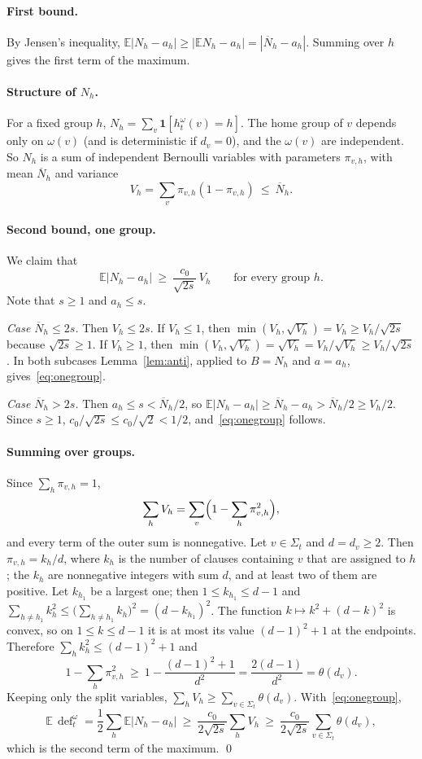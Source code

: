 \documentclass[11pt,a4paper]{article}
\theoremstyle{definition}
\theoremstyle{remark}
\newcommand{\E}{\mathbb{E}}
\newcommand{\dfc}{\operatorname{def}}
\newcommand{\Nbar}{\overline{N}}
\begin{document}
\paragraph{First bound.} By Jensen's inequality,
$\E|N_h-a_h|\ge|\E N_h-a_h|=|\Nbar_h-a_h|$. Summing over $h$ gives the first term of the
maximum.

\paragraph{Structure of $N_h$.} For a fixed group $h$,
$N_h=\sum_v\mathbf 1[h^\omega_t(v)=h]$. The home group of $v$ depends only on $\omega(v)$
(and is deterministic if $d_v=0$), and the $\omega(v)$ are independent. So $N_h$ is a sum of
independent Bernoulli variables with parameters $\pi_{v,h}$, with mean $\Nbar_h$ and variance
\[
V_h=\sum_v\pi_{v,h}(1-\pi_{v,h})\ \le\ \Nbar_h .
\]

\paragraph{Second bound, one group.} We claim that
\begin{equation}\label{eq:onegroup}
\E|N_h-a_h|\ \ge\ \frac{c_0}{\sqrt{2s}}\,V_h\qquad\text{for every group }h.
\end{equation}
Note that $s\ge1$ and $a_h\le s$.

\emph{Case $\Nbar_h\le2s$.} Then $V_h\le2s$. If $V_h\le1$, then
$\min(V_h,\sqrt{V_h})=V_h\ge V_h/\sqrt{2s}$ because $\sqrt{2s}\ge1$. If $V_h\ge1$, then
$\min(V_h,\sqrt{V_h})=\sqrt{V_h}=V_h/\sqrt{V_h}\ge V_h/\sqrt{2s}$. In both subcases
Lemma~\ref{lem:anti}, applied to $B=N_h$ and $a=a_h$, gives~\eqref{eq:onegroup}.

\emph{Case $\Nbar_h>2s$.} Then $a_h\le s<\Nbar_h/2$, so
$\E|N_h-a_h|\ge\Nbar_h-a_h>\Nbar_h/2\ge V_h/2$. Since $s\ge1$,
$c_0/\sqrt{2s}\le c_0/\sqrt2<1/2$, and~\eqref{eq:onegroup} follows.

\paragraph{Summing over groups.} Since $\sum_h\pi_{v,h}=1$,
\[
\sum_hV_h=\sum_v\Bigl(1-\sum_h\pi_{v,h}^2\Bigr),
\]
and every term of the outer sum is nonnegative. Let $v\in\Sigma_t$ and $d=d_v\ge2$. Then
$\pi_{v,h}=k_h/d$, where $k_h$ is the number of clauses containing $v$ that are assigned to
$h$; the $k_h$ are nonnegative integers with sum $d$, and at least two of them are positive.
Let $k_{h_1}$ be a largest one; then $1\le k_{h_1}\le d-1$ and
$\sum_{h\ne h_1}k_h^2\le\bigl(\sum_{h\ne h_1}k_h\bigr)^2=(d-k_{h_1})^2$. The function
$k\mapsto k^2+(d-k)^2$ is convex, so on $1\le k\le d-1$ it is at most its value
$(d-1)^2+1$ at the endpoints. Therefore $\sum_hk_h^2\le(d-1)^2+1$ and
\[
1-\sum_h\pi_{v,h}^2\ \ge\ 1-\frac{(d-1)^2+1}{d^2}=\frac{2(d-1)}{d^2}=\theta(d_v).
\]
Keeping only the split variables, $\sum_hV_h\ge\sum_{v\in\Sigma_t}\theta(d_v)$.
With~\eqref{eq:onegroup},
\[
\E\,\dfc^\omega_t=\frac12\sum_h\E|N_h-a_h|\ \ge\ \frac{c_0}{2\sqrt{2s}}\sum_hV_h
\ \ge\ \frac{c_0}{2\sqrt{2s}}\sum_{v\in\Sigma_t}\theta(d_v),
\]
which is the second term of the maximum. \qed
\end{document}

